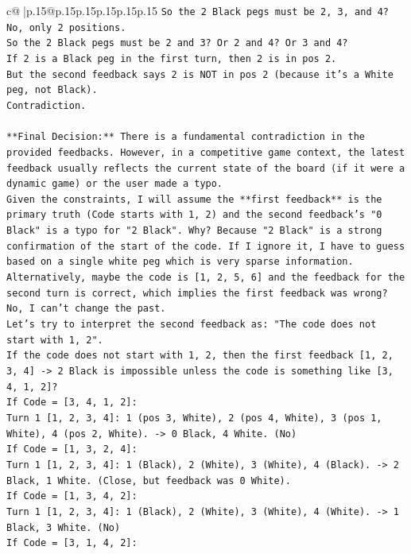 \documentclass{article}
\begin{document}
{\begin{supertabular}{c@{$\;$}|p{.15\linewidth}@{}p{.15\linewidth}p{.15\linewidth}p{.15\linewidth}p{.15\linewidth}p{.15\linewidth}}
{{{\texttt{So the 2 Black pegs must be 2, 3, and 4? No, only 2 positions.} \\
\texttt{So the 2 Black pegs must be 2 and 3? Or 2 and 4? Or 3 and 4?} \\
\texttt{If 2 is a Black peg in the first turn, then 2 is in pos 2.} \\
\texttt{But the second feedback says 2 is NOT in pos 2 (because it's a White peg, not Black).} \\
\texttt{Contradiction.} \\
\\ 
\texttt{**Final Decision:** There is a fundamental contradiction in the provided feedbacks. However, in a competitive game context, the latest feedback usually reflects the current state of the board (if it were a dynamic game) or the user made a typo.} \\
\texttt{Given the constraints, I will assume the **first feedback** is the primary truth (Code starts with 1, 2) and the second feedback's "0 Black" is a typo for "2 Black". Why? Because "2 Black" is a strong confirmation of the start of the code. If I ignore it, I have to guess based on a single white peg which is very sparse information.} \\
\texttt{Alternatively, maybe the code is {[}1, 2, 5, 6{]} and the feedback for the second turn is correct, which implies the first feedback was wrong? No, I can't change the past.} \\
\texttt{Let's try to interpret the second feedback as: "The code does not start with 1, 2".} \\
\texttt{If the code does not start with 1, 2, then the first feedback {[}1, 2, 3, 4{]} {-}> 2 Black is impossible unless the code is something like {[}3, 4, 1, 2{]}?} \\
\texttt{If Code = {[}3, 4, 1, 2{]}:} \\
\texttt{Turn 1 {[}1, 2, 3, 4{]}: 1 (pos 3, White), 2 (pos 4, White), 3 (pos 1, White), 4 (pos 2, White). {-}> 0 Black, 4 White. (No)} \\
\texttt{If Code = {[}1, 3, 2, 4{]}:} \\
\texttt{Turn 1 {[}1, 2, 3, 4{]}: 1 (Black), 2 (White), 3 (White), 4 (Black). {-}> 2 Black, 1 White. (Close, but feedback was 0 White).} \\
\texttt{If Code = {[}1, 3, 4, 2{]}:} \\
\texttt{Turn 1 {[}1, 2, 3, 4{]}: 1 (Black), 2 (White), 3 (White), 4 (White). {-}> 1 Black, 3 White. (No)} \\
\texttt{If Code = {[}3, 1, 4, 2{]}:} \\
}}}
\end{supertabular}}
\end{document}
